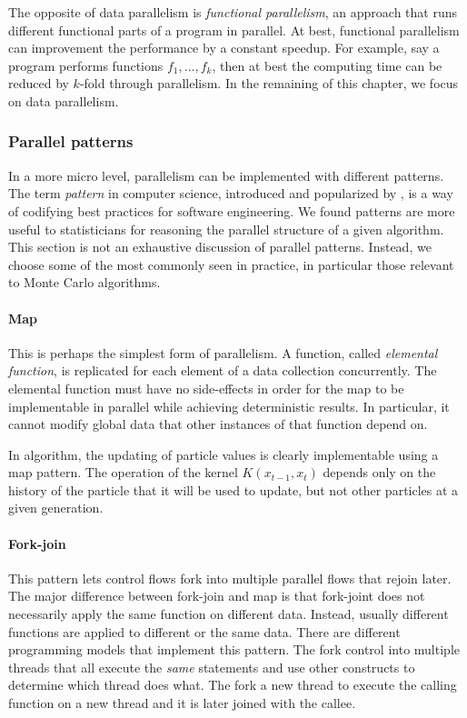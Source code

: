 The opposite of data parallelism is \emph{functional parallelism}, an approach
that runs different functional parts of a program in parallel. At best,
functional parallelism can improvement the performance by a constant speedup.
For example, say a program performs functions $f_1,\dots,f_k$, then at best
the computing time can be reduced by $k$-fold through parallelism. In the
remaining of this chapter, we focus on data parallelism.

\subsubsection{Parallel patterns}
\label{ssub:Parallel patterns}

In a more micro level, parallelism can be implemented with different patterns.
The term \emph{pattern} in computer science, introduced and popularized by
\cite{software:GoF}, is a way of codifying best practices for software
engineering. We found patterns are more useful to statisticians for reasoning
the parallel structure of a given algorithm. This section is not an exhaustive
discussion of parallel patterns. Instead, we choose some of the most commonly
seen in practice, in particular those relevant to Monte Carlo algorithms.

\paragraph{Map}

This is perhaps the simplest form of parallelism. A function, called
\emph{elemental function}, is replicated for each element of a data collection
concurrently. The elemental function must have no side-effects in order for
the map to be implementable in parallel while achieving deterministic results.
In particular, it cannot modify global data that other instances of that
function depend on.

In \smc algorithm, the updating of particle values is clearly implementable
using a map pattern. The operation of the kernel $K(x_{t-1},x_t)$ depends only
on the history of the particle that it will be used to update, but not other
particles at a given generation.

\paragraph{Fork-join}

This pattern lets control flows fork into multiple parallel flows that rejoin
later. The major difference between fork-join and map is that fork-joint does
not necessarily apply the same function on different data. Instead, usually
different functions are applied to different or the same data. There are
different programming models that implement this pattern. The \openmp
{} fork control into multiple threads that all
execute the \emph{same} statements and use other constructs to determine which
thread does what. The \cilk \cite{cilk}  fork a new thread to
execute the calling function on a new thread and it is later joined with the
callee.

